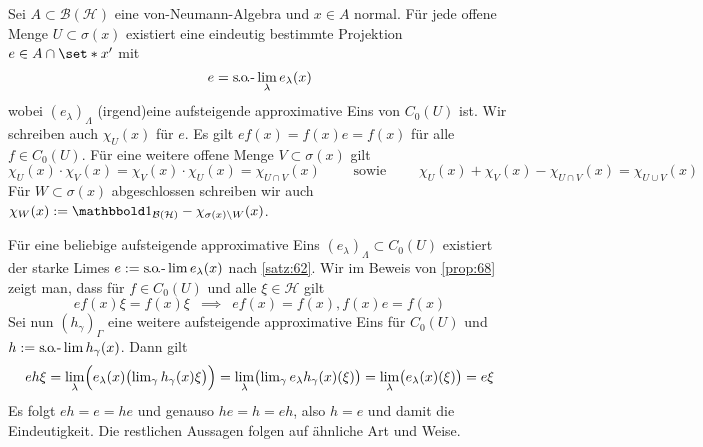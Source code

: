 \begin{proposition}[label=prop:612,{name=[approximative Einsen in offener Teilmenge des Spektrums]}]
	Sei $A \subset \mathcal{B}(\mathcal{H})$ eine von-Neumann-Algebra und $x \in A$ normal.
	Für jede offene Menge $U \subset \sigma(x)$ existiert eine eindeutig bestimmte Projektion $e \in A \cap \set*{x}'$ mit 
	\[
		e=\solim_\lambda e_\lambda(x)
	\]
	wobei $(e_\lambda)_\Lambda$ (irgend)eine aufsteigende approximative Eins von $C_0(U)$ ist.
	Wir schreiben auch $\chi_U(x)$ für $e$.
	Es gilt $e f(x) = f(x) e = f(x)$ für alle $f \in C_0(U)$.
	Für eine weitere offene Menge $V \subset \sigma(x)$ gilt 
	\[
		\chi_U(x) \cdot \chi_V(x)=\chi_V(x) \cdot \chi_U(x) = \chi_{U \cap V}(x) \qquad\! \text{ sowie } \qquad\!\chi_U(x) + \chi_V(x) - \chi_{U \cap V}(x)= \chi_{U \cup V}(x) 
	\]
	Für $W \subset \sigma(x)$ abgeschlossen schreiben wir auch $\chi_W(x) := \ind_{\mathcal{B}(\mathcal{H})}-\chi_{\sigma(x)\setminus W}(x)$.
\end{proposition}
\begin{beweis}
	Für eine beliebige aufsteigende approximative Eins $(e_\lambda)_\Lambda \subset C_0(U)$ existiert der starke Limes $e := \solim e_\lambda(x)$ nach \autoref{satz:62}.
	Wir im Beweis von \autoref{prop:68} zeigt man, dass für $f \in C_0(U)$ und alle $\xi \in \mathcal{H}$ gilt
	\[
		e f(x) \xi = f(x) \xi \enspace\implies\enspace e f(x) = f(x), f(x) e = f(x)
	\]
	Sei nun $(h_\gamma)_{\Gamma}$ eine weitere aufsteigende approximative Eins für $C_0(U)$ und $h := \solim h_\gamma(x)$.
	Dann gilt
	\[
		e h \xi = \lim_\lambda \enbrace[\Big]{e_\lambda(x) \enbrace[\big]{\lim\nolimits_\gamma h_\gamma(x) \xi}} = \lim_{\lambda} \enbrace[\big]{\lim\nolimits_\gamma e_\lambda h_\gamma(x)(\xi)}
		= \lim_\lambda \enbrace[\big]{e_\lambda(x)(\xi)} = e \xi
	\]
	Es folgt $ e h = e = h e$ und genauso $h e = h =eh$, also $h=e$ und damit die Eindeutigkeit. 
	Die restlichen Aussagen folgen auf ähnliche Art und Weise.
\end{beweis}

